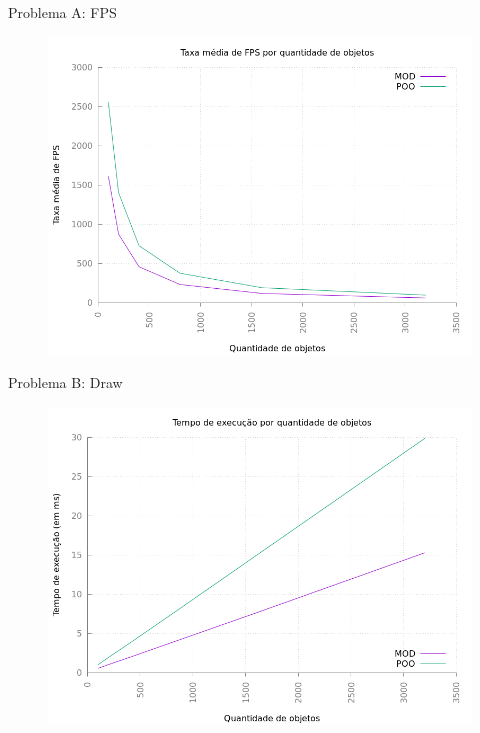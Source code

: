 \documentclass{beamer}
\begin{document}
\begin{frame}{Problema A: FPS}
    \begin{figure}[h!]
        \centering
        \includegraphics[width =.8\textwidth]{figuras/fpsv1}
        \par\medskip
    \end{figure}
\end{frame}

\begin{frame}{Problema B: Draw}
    \begin{figure}[h!]
        \centering
        \includegraphics[width =.8\textwidth]{figuras/drawv2graph}
        \par\medskip
    \end{figure}
\end{frame}
\end{document}
